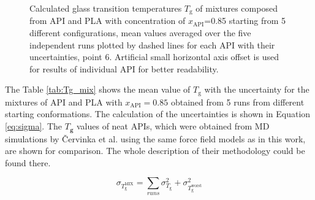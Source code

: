 \begin{figure}[htb!]
	\centering
	\vspace{-0.2cm}
	\caption{Calculated glass transition temperatures $T_\text{g}$ of mixtures composed from API and PLA with concentration of $x_\text{API}$=0.85 starting from 5 different configurations, mean values averaged over the five independent runs plotted by dashed lines for each API with their uncertainties, point 6. Artificial small horizontal axis offset is used for results of individual API for better readability.}
	\label{fig:results_tg}    
\end{figure}  



The Table \ref{tab:Tg_mix} shows the mean value of $T_\text{g}$ with the uncertainty for the mixtures of API and PLA with $x_\text{API}=0.85$ obtained from 5 runs from different starting conformations. The calculation of the uncertainties is shown in Equation \ref{eq:sigma}. The $T_\textbf{g}$ values of neat APIs, which were obtained from MD simulations by Červinka et al. \cite{cervinka_structure_2021} using the same force field models as in this work, are shown for comparison. The whole description of their methodology could be found there. 

\begin{equation}\label{eq:sigma}
	\sigma_{T_{\text{g}}^\text{MIX}} = \sum_{runs} \sigma_{T_{\text{g}}^\text{}}^2 + \sigma_{T_{\text{g}}^\text{worst}}^2
\end{equation}

